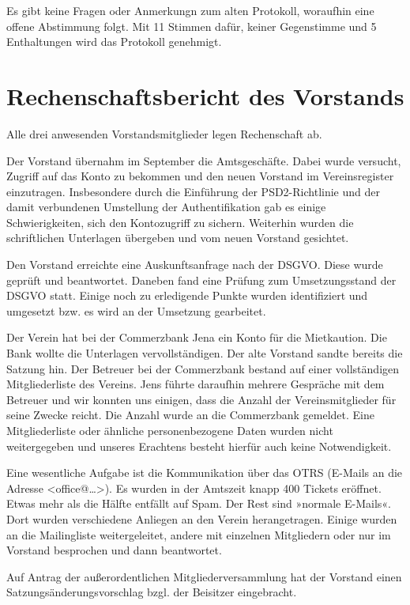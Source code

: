 \documentclass[DIV=calc,parksip=half*]{scrartcl}
\begin{document}
Es gibt keine Fragen oder Anmerkungn zum alten Protokoll, woraufhin eine offene Abstimmung folgt. Mit 11 Stimmen dafür, keiner Gegenstimme und 5 Enthaltungen wird das Protokoll genehmigt.
\section{Rechenschaftsbericht des Vorstands}

Alle drei anwesenden Vorstandsmitglieder legen Rechenschaft ab. 

Der Vorstand übernahm im September die Amtsgeschäfte. Dabei wurde versucht, Zugriff auf das Konto zu bekommen und den neuen Vorstand im Vereinsregister einzutragen. Insbesondere durch die Einführung der PSD2-Richtlinie und der damit verbundenen Umstellung der Authentifikation gab es einige Schwierigkeiten, sich den Kontozugriff zu sichern.
Weiterhin wurden die schriftlichen Unterlagen übergeben und vom neuen Vorstand gesichtet.

Den Vorstand erreichte eine Auskunftsanfrage nach der DSGVO. Diese wurde geprüft und beantwortet. Daneben fand eine Prüfung zum Umsetzungsstand der DSGVO statt. Einige noch zu erledigende Punkte wurden identifiziert und umgesetzt bzw. es wird an der Umsetzung gearbeitet.

Der Verein hat bei der Commerzbank Jena ein Konto für die Mietkaution. Die Bank wollte die Unterlagen vervollständigen. Der alte Vorstand sandte bereits die Satzung hin. Der Betreuer bei der Commerzbank bestand auf einer vollständigen Mitgliederliste des Vereins. Jens führte daraufhin mehrere Gespräche mit dem Betreuer und wir konnten uns einigen, dass die Anzahl der Vereinsmitglieder für seine Zwecke reicht. Die Anzahl wurde an die Commerzbank gemeldet. Eine Mitgliederliste oder ähnliche personenbezogene Daten wurden nicht weitergegeben und unseres Erachtens besteht hierfür auch keine Notwendigkeit.

Eine wesentliche Aufgabe ist die Kommunikation über das OTRS (E-Mails an die Adresse <office@…>). Es wurden in der Amtszeit knapp 400 Tickets eröffnet. Etwas mehr als die Hälfte entfällt auf Spam. Der Rest sind »normale E-Mails«. Dort wurden verschiedene Anliegen an den Verein herangetragen. Einige wurden an die Mailingliste weitergeleitet, andere mit einzelnen Mitgliedern oder nur im Vorstand besprochen und dann beantwortet.

Auf Antrag der außerordentlichen Mitgliederversammlung hat der Vorstand einen Satzungsänderungsvorschlag bzgl. der Beisitzer eingebracht. 
\end{document}
